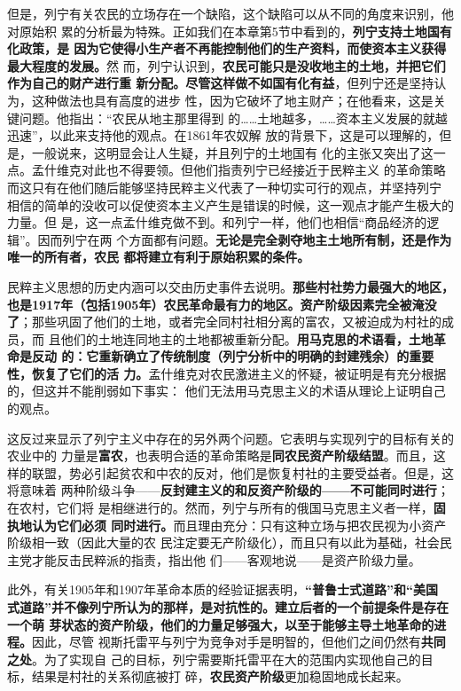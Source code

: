 但是，列宁有关农民的立场存在一个缺陷，这个缺陷可以从不同的角度来识别，他对原始积
累的分析最为特殊。正如我们在本章第5节中看到的，\textbf{列宁支持土地国有化政策，是
  因为它使得小生产者不再能控制他们的生产资料，而使资本主义获得最大程度的发展。}然
而，列宁认识到，\textbf{农民可能只是没收地主的土地，并把它们作为自己的财产进行重
  新分配。尽管这样做不如国有化有益}，但列宁还是坚持认为，这种做法也具有高度的进步
性，因为它破坏了地主财产；在他看来，这是关键问题。他指出：“农民从地主那里得到
的……土地越多，……资本主义发展的就越迅速”，以此来支持他的观点。在1861年农奴解
放的背景下，这是可以理解的，但是，一般说来，这明显会让人生疑，并且列宁的土地国有
化的主张又突出了这一点。孟什维克对此也不得要领。但他们指责列宁已经接近于民粹主义
的革命策略而这只有在他们随后能够坚持民粹主义代表了一种切实可行的观点，并坚持列宁
相信的简单的没收可以促使资本主义产生是错误的时候，这一观点才能产生极大的力量。但
是，这一点孟什维克做不到。和列宁一样，他们也相信“商品经济的逻辑”。因而列宁在两
个方面都有问题。\textbf{无论是完全剥夺地主土地所有制，还是作为唯一的所有者，农民
  都将建立有利于原始积累的条件。}

民粹主义思想的历史内涵可以交由历史事件去说明。\textbf{那些村社势力最强大的地区，
  也是1917年（包括1905年）农民革命最有力的地区。资产阶级因素完全被淹没
  了}；那些巩固了他们的土地，或者完全同村社相分离的富农，又被迫成为村社的成员，而
且他们的土地连同地主的土地都被重新分配。\textbf{用马克思的术语看，土地革命是反动
  的：它重新确立了传统制度（列宁分析中的明确的封建残余）的重要性，恢复了它们的活
  力。}孟什维克对农民激进主义的怀疑，被证明是有充分根据的，但这并不能削弱如下事实：
他们无法用马克思主义的术语从理论上证明自己的观点。

这反过来显示了列宁主义中存在的另外两个问题。它表明与实现列宁的目标有关的农业中的
力量是\textbf{富农}，也表明合适的革命策略是\textbf{同农民资产阶级结盟}。而且，这
样的联盟，势必引起贫农和中农的反对，他们是恢复村社的主要受益者。但是，这将意味着
两种阶级斗争——\textbf{反封建主义的和反资产阶级的——不可能同时进行}；在农村，它们将
是相继进行的。然而，列宁与所有的俄国马克思主义者一样，\textbf{固执地认为它们必须
  同时进行。}而且理由充分：只有这种立场与把农民视为小资产阶级相一致（因此大量的农
民注定要无产阶级化），而且只有以此为基础，社会民主党才能反击民粹派的指责，指出他
们——客观地说——是资产阶级力量。

此外，有关1905年和1907年革命本质的经验证据表明，\textbf{“普鲁士式道路”和“美国
  式道路”并不像列宁所认为的那样，是对抗性的。建立后者的一个前提条件是存在一个萌
  芽状态的资产阶级，他们的力量足够强大，以至于能够主导土地革命的进程。}因此，尽管
视斯托雷平与列宁为竞争对手是明智的，但他们之间仍然有\textbf{共同之处}。为了实现自
己的目标，列宁需要斯托雷平在大的范围内实现他自己的目标，结果是村社的关系彻底被打
碎，\textbf{农民资产阶级}更加稳固地成长起来。

